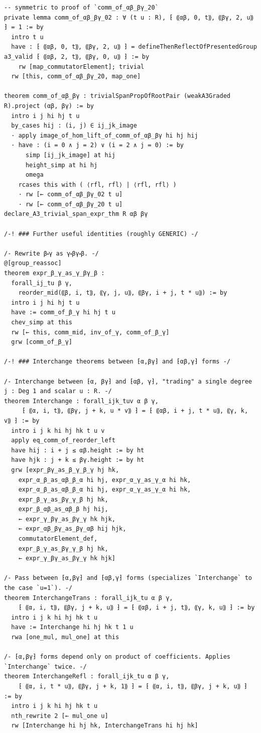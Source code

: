 \documentclass[10pt,a4paper]{article}
\begin{document}
\begin{Verbatim}
-- symmetric to proof of `comm_of_αβ_βγ_20`
private lemma comm_of_αβ_βγ_02 : ∀ (t u : R), ⁅ ⸨αβ, 0, t⸩, ⸨βγ, 2, u⸩ ⁆ = 1 := by
  intro t u
  have : ⁅ ⸨αβ, 0, t⸩, ⸨βγ, 2, u⸩ ⁆ = defineThenReflectOfPresentedGroup a3_valid ⁅ ⸨αβ, 2, t⸩, ⸨βγ, 0, u⸩ ⁆ := by
    rw [map_commutatorElement]; trivial
  rw [this, comm_of_αβ_βγ_20, map_one]

theorem comm_of_αβ_βγ : trivialSpanPropOfRootPair (weakA3Graded R).project (αβ, βγ) := by
  intro i j hi hj t u
  by_cases hij : (i, j) ∈ ij_jk_image
  · apply image_of_hom_lift_of_comm_of_αβ_βγ hi hj hij
  · have : (i = 0 ∧ j = 2) ∨ (i = 2 ∧ j = 0) := by
      simp [ij_jk_image] at hij
      height_simp at hi hj
      omega
    rcases this with ( ⟨rfl, rfl⟩ | ⟨rfl, rfl⟩ )
    · rw [← comm_of_αβ_βγ_02 t u]
    · rw [← comm_of_αβ_βγ_20 t u]
declare_A3_trivial_span_expr_thm R αβ βγ

/-! ### Further useful identities (roughly GENERIC) -/

/- Rewrite β⬝γ as γ⬝βγ⬝β. -/
@[group_reassoc]
theorem expr_β_γ_as_γ_βγ_β :
  forall_ij_tu β γ,
    reorder_mid(⸨β, i, t⸩, ⸨γ, j, u⸩, ⸨βγ, i + j, t * u⸩) := by
  intro i j hi hj t u
  have := comm_of_β_γ hi hj t u
  chev_simp at this
  rw [← this, comm_mid, inv_of_γ, comm_of_β_γ]
  grw [comm_of_β_γ]

/-! ### Interchange theorems between ⁅α,βγ⁆ and ⁅αβ,γ⁆ forms -/

/- Interchange between ⁅α, βγ⁆ and ⁅αβ, γ⁆, "trading" a single degree j : Deg 1 and scalar u : R. -/
theorem Interchange : forall_ijk_tuv α β γ,
     ⁅ ⸨α, i, t⸩, ⸨βγ, j + k, u * v⸩ ⁆ = ⁅ ⸨αβ, i + j, t * u⸩, ⸨γ, k, v⸩ ⁆ := by
  intro i j k hi hj hk t u v
  apply eq_comm_of_reorder_left
  have hij : i + j ≤ αβ.height := by ht
  have hjk : j + k ≤ βγ.height := by ht
  grw [expr_βγ_as_β_γ_β_γ hj hk,
    expr_α_β_as_αβ_β_α hi hj, expr_α_γ_as_γ_α hi hk,
    expr_α_β_as_αβ_β_α hi hj, expr_α_γ_as_γ_α hi hk,
    expr_β_γ_as_βγ_γ_β hj hk,
    expr_β_αβ_as_αβ_β hj hij,
    ← expr_γ_βγ_as_βγ_γ hk hjk,
    ← expr_αβ_βγ_as_βγ_αβ hij hjk,
    commutatorElement_def,
    expr_β_γ_as_βγ_γ_β hj hk,
    ← expr_γ_βγ_as_βγ_γ hk hjk]

/- Pass between ⁅α,βγ⁆ and ⁅αβ,γ⁆ forms (specializes `Interchange` to the case `u=1`). -/
theorem InterchangeTrans : forall_ijk_tu α β γ,
    ⁅ ⸨α, i, t⸩, ⸨βγ, j + k, u⸩ ⁆ = ⁅ ⸨αβ, i + j, t⸩, ⸨γ, k, u⸩ ⁆ := by
  intro i j k hi hj hk t u
  have := Interchange hi hj hk t 1 u
  rwa [one_mul, mul_one] at this

/- ⁅α,βγ⁆ forms depend only on product of coefficients. Applies `Interchange` twice. -/
theorem InterchangeRefl : forall_ijk_tu α β γ,
    ⁅ ⸨α, i, t * u⸩, ⸨βγ, j + k, 1⸩ ⁆ = ⁅ ⸨α, i, t⸩, ⸨βγ, j + k, u⸩ ⁆ := by
  intro i j k hi hj hk t u
  nth_rewrite 2 [← mul_one u]
  rw [Interchange hi hj hk, InterchangeTrans hi hj hk]


\end{Verbatim}
\end{document}
